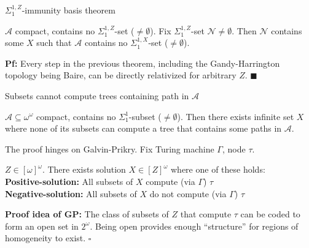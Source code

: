 \begin{frame}{$\Sigma_1^{1,Z}$-immunity basis theorem}
  \begin{coro}
    $\mathcal{A}$ compact, contains no $\Sigma_1^{1,Z}$-set
    ($\neq\emptyset$). Fix $\Sigma_1^{1,Z}$-set
    $\mathcal{N}\neq\emptyset$. Then $\mathcal{N}$ contains some $X$ such
    that $\mathcal{A}$ contains no $\Sigma_1^{1,X}$-set ($\neq\emptyset$).
  \end{coro}

  \vspace{1em}
  \textbf{Pf:} Every step in the previous theorem, including the
  Gandy-Harrington topology being Baire, can be directly relativized for
  arbitrary $Z$. $\blacksquare$
\end{frame}

\begin{frame}{Subsets cannot compute trees containing path in $\mathcal{A}$}
  \begin{main-thm*}
    $\mathcal{A}\subseteq\omega^\omega$ compact, contains no
    $\Sigma_1^1$-subset ($\neq\emptyset$). Then there exists infinite set
    $X$ where none of its subsets can compute a tree that contains some
    paths in $\mathcal{A}$.
  \end{main-thm*}

  The proof hinges on Galvin-Prikry. Fix Turing machine $\Gamma$, node
  $\tau$.
  \begin{fact*}
    $Z\in[\omega]^\omega$. There exists solution $X\in[Z]^\omega$
    where one of these holds:\\
    \textbf{Positive-solution:} All subsets of $X$ compute (via $\Gamma$)
    $\tau$ \\
    \textbf{Negative-solution:} All subsets of $X$ do not compute (via
    $\Gamma$) $\tau$
  \end{fact*}
  \textbf{Proof idea of GP:} The class of subsets of $Z$ that
  compute $\tau$ can be coded to form an open set in $2^\omega$. Being
  open provides enough ``structure'' for regions of homogeneity to exist.
  $\square$
\end{frame}


